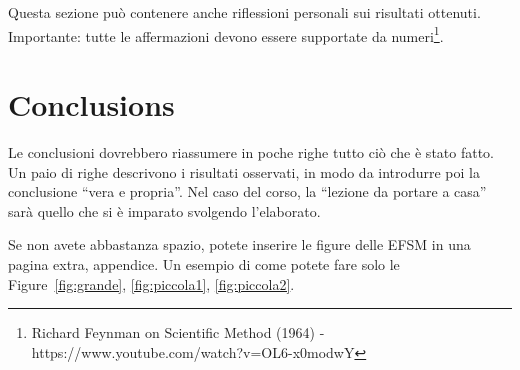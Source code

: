 \documentclass[12pt]{IEEEtran}
\begin{document}
Questa sezione pu\`o contenere anche riflessioni personali sui risultati ottenuti. Importante: tutte le affermazioni devono essere supportate da numeri\footnote{Richard Feynman on Scientific Method (1964) -\\ https://www.youtube.com/watch?v=OL6-x0modwY}.

\section{Conclusions}
Le conclusioni dovrebbero riassumere in poche righe  tutto ci\`o che \`e stato fatto. Un paio di righe descrivono i risultati osservati, in modo da introdurre poi la conclusione ``vera e propria''. Nel caso del corso, la ``lezione da portare a casa'' sar\`a quello che si \`e imparato svolgendo l'elaborato.





\appendix
Se non avete abbastanza spazio, potete inserire le figure delle EFSM in una  pagina extra, appendice. Un esempio di come potete fare solo le Figure~\ref{fig:grande}, \ref{fig:piccola1}, \ref{fig:piccola2}.
\end{document}
